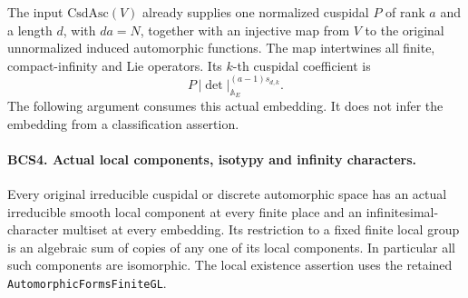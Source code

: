 The input \(\mathrm{CsdAsc}(V)\) already supplies one normalized
cuspidal \(P\) of rank \(a\) and a length \(d\), with
\(da=N\), together with an injective map from \(V\) to the
original unnormalized induced automorphic functions.  The map
intertwines all finite, compact-infinity and Lie operators.  Its
\(k\)-th cuspidal coefficient is
\[
                P\,|\det|_{\mathbb A_E}^{(a-1)s_{d,k}}.
 \tag{BCS.7}
\]
The following argument consumes this actual embedding.  It does not
infer the embedding from a classification assertion.

\paragraph{BCS4. Actual local components, isotypy and infinity characters.}
\label{claim:BCS4}
Every original irreducible cuspidal or discrete automorphic space
has an actual irreducible smooth local component at every finite
place and an infinitesimal-character multiset at every embedding.
Its restriction to a fixed finite local group is an algebraic sum
of copies of any one of its local components.  In particular all
such components are isomorphic.  The local existence assertion uses
the retained \texttt{AutomorphicFormsFiniteGL}.
